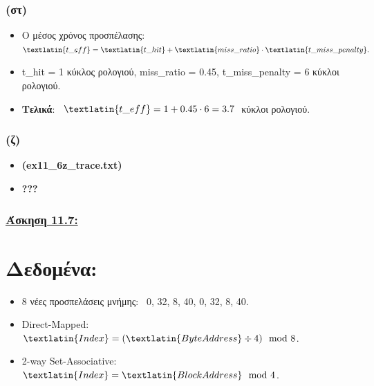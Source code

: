 \documentclass{article}
\begin{document}
\subsubsection*{\textbf{(στ)}}

\begin{itemize}
    \item {Ο μέσος χρόνος προσπέλασης}: \ \(\textlatin{t\_eff} = \textlatin{t\_hit} + \textlatin{miss\_ratio} \cdot \textlatin{t\_miss\_penalty}.\)
\end{itemize}

\begin{itemize}
    \item \textlatin{t\_hit} = 1 {κύκλος ρολογιού}, \textlatin{miss\_ratio} = 0.45, \textlatin{t\_miss\_penalty} = 6 {κύκλοι ρολογιού}.
    \item \textbf{Τελικά}: \ \(\textlatin{t\_eff} = 1 + 0.45 \cdot 6 = 3.7 \ \) {κύκλοι ρολογιού}.
\end{itemize}

\subsubsection*{\textbf{(ζ)}}

\begin{itemize}
    \item \textbf{\textlatin{(ex11\_6z\_trace.txt)}}
    \item \textbf{\textlatin{???}} 
\end{itemize}








\newpage

\subsubsection*{\underline{\textbf{Άσκηση 11.7:}}}
\vspace{0.55cm}

\section*{\textbf{Δεδομένα:}}
\begin{itemize}
    \item {8 νέες προσπελάσεις μνήμης}: \ 0, 32, 8, 40, 0, 32, 8, 40.
    \item \textlatin{Direct-Mapped}: $\textlatin{Index} = (\textlatin{Byte Address} \div 4) \mod 8$.
    \item \textlatin{2-way Set-Associative}: $\textlatin{Index} = \textlatin{Block Address} \mod 4$.
\end{itemize}
\end{document}
